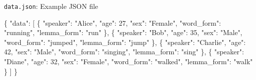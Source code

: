 \documentclass[
  letterpaper,
  DIV=11,
  numbers=noendperiod]{scrreport}
\newenvironment{Shaded}{\begin{snugshade}}{\end{snugshade}}
\newcommand{\DataTypeTok}[1]{\textcolor[rgb]{0.00,0.00,0.00}{#1}}
\newcommand{\DecValTok}[1]{\textcolor[rgb]{0.00,0.00,0.00}{#1}}
\newcommand{\FunctionTok}[1]{\textcolor[rgb]{0.00,0.00,0.00}{#1}}
\newcommand{\OtherTok}[1]{\textcolor[rgb]{0.00,0.00,0.00}{#1}}
\newcommand{\StringTok}[1]{\textcolor[rgb]{0.00,0.00,0.00}{#1}}
\theoremstyle{definition}
\theoremstyle{remark}
\begin{document}
\begin{codelisting}

\caption{\texttt{data.json}: Example JSON file}

\hypertarget{lst-cd-json-example}{%
\label{lst-cd-json-example}}%
\begin{Shaded}
\begin{Highlighting}[]
\FunctionTok{\{}
    \DataTypeTok{"data"}\FunctionTok{:} \OtherTok{[}
        \FunctionTok{\{}
            \DataTypeTok{"speaker"}\FunctionTok{:} \StringTok{"Alice"}\FunctionTok{,}
            \DataTypeTok{"age"}\FunctionTok{:} \DecValTok{27}\FunctionTok{,}
            \DataTypeTok{"sex"}\FunctionTok{:} \StringTok{"Female"}\FunctionTok{,}
            \DataTypeTok{"word\_form"}\FunctionTok{:} \StringTok{"running"}\FunctionTok{,}
            \DataTypeTok{"lemma\_form"}\FunctionTok{:} \StringTok{"run"}
        \FunctionTok{\}}\OtherTok{,}
        \FunctionTok{\{}
            \DataTypeTok{"speaker"}\FunctionTok{:} \StringTok{"Bob"}\FunctionTok{,}
            \DataTypeTok{"age"}\FunctionTok{:} \DecValTok{35}\FunctionTok{,}
            \DataTypeTok{"sex"}\FunctionTok{:} \StringTok{"Male"}\FunctionTok{,}
            \DataTypeTok{"word\_form"}\FunctionTok{:} \StringTok{"jumped"}\FunctionTok{,}
            \DataTypeTok{"lemma\_form"}\FunctionTok{:} \StringTok{"jump"}
        \FunctionTok{\}}\OtherTok{,}
        \FunctionTok{\{}
            \DataTypeTok{"speaker"}\FunctionTok{:} \StringTok{"Charlie"}\FunctionTok{,}
            \DataTypeTok{"age"}\FunctionTok{:} \DecValTok{42}\FunctionTok{,}
            \DataTypeTok{"sex"}\FunctionTok{:} \StringTok{"Male"}\FunctionTok{,}
            \DataTypeTok{"word\_form"}\FunctionTok{:} \StringTok{"singing"}\FunctionTok{,}
            \DataTypeTok{"lemma\_form"}\FunctionTok{:} \StringTok{"sing"}
        \FunctionTok{\}}\OtherTok{,}
        \FunctionTok{\{}
            \DataTypeTok{"speaker"}\FunctionTok{:} \StringTok{"Diane"}\FunctionTok{,}
            \DataTypeTok{"age"}\FunctionTok{:} \DecValTok{32}\FunctionTok{,}
            \DataTypeTok{"sex"}\FunctionTok{:} \StringTok{"Female"}\FunctionTok{,}
            \DataTypeTok{"word\_form"}\FunctionTok{:} \StringTok{"walked"}\FunctionTok{,}
            \DataTypeTok{"lemma\_form"}\FunctionTok{:} \StringTok{"walk"}
        \FunctionTok{\}}
    \OtherTok{]}
\FunctionTok{\}}
\end{Highlighting}
\end{Shaded}

\end{codelisting}
\end{document}
